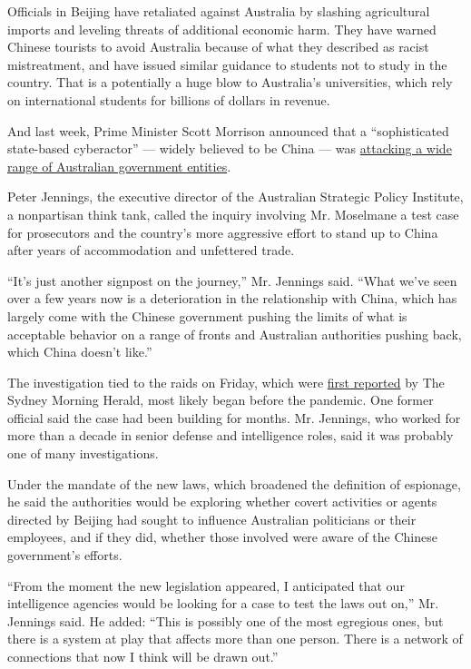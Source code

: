 Officials in Beijing have retaliated against Australia by slashing
agricultural imports and leveling threats of additional economic harm.
They have warned Chinese tourists to avoid Australia because of what
they described as racist mistreatment, and have issued similar guidance
to students not to study in the country. That is a potentially a huge
blow to Australia's universities, which rely on international students
for billions of dollars in revenue.

And last week, Prime Minister Scott Morrison announced that a
``sophisticated state-based cyberactor'' --- widely believed to be China
--- was
\href{https://www.abc.net.au/news/2020-06-19/cyber-attacks-likely-huawei-5g-ban-payback-from-china-spy-agency/12374374}{attacking
a wide range of Australian government entities}.

Peter Jennings, the executive director of the Australian Strategic
Policy Institute, a nonpartisan think tank, called the inquiry involving
Mr. Moselmane a test case for prosecutors and the country's more
aggressive effort to stand up to China after years of accommodation and
unfettered trade.

``It's just another signpost on the journey,'' Mr. Jennings said. ``What
we've seen over a few years now is a deterioration in the relationship
with China, which has largely come with the Chinese government pushing
the limits of what is acceptable behavior on a range of fronts and
Australian authorities pushing back, which China doesn't like.''

The investigation tied to the raids on Friday, which were
\href{https://www.smh.com.au/politics/nsw/nsw-labor-mp-shaoquett-moselmane-to-be-suspended-after-raids-probing-china-links-20200626-p556gd.html}{first
reported} by The Sydney Morning Herald, most likely began before the
pandemic. One former official said the case had been building for
months. Mr. Jennings, who worked for more than a decade in senior
defense and intelligence roles, said it was probably one of many
investigations.

Under the mandate of the new laws, which broadened the definition of
espionage, he said the authorities would be exploring whether covert
activities or agents directed by Beijing had sought to influence
Australian politicians or their employees, and if they did, whether
those involved were aware of the Chinese government's efforts.

``From the moment the new legislation appeared, I anticipated that our
intelligence agencies would be looking for a case to test the laws out
on,'' Mr. Jennings said. He added: ``This is possibly one of the most
egregious ones, but there is a system at play that affects more than one
person. There is a network of connections that now I think will be drawn
out.''

